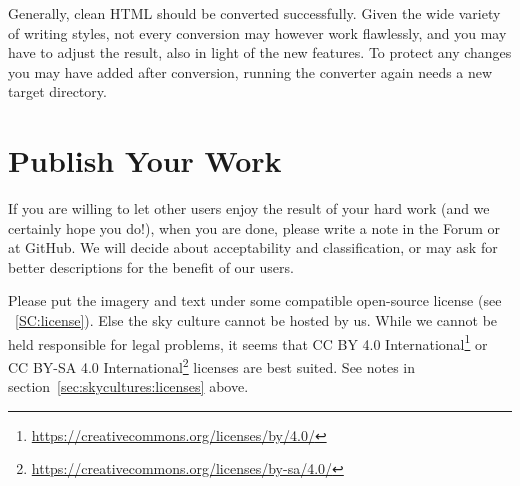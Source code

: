 Generally, clean HTML should be converted successfully. 
Given the wide variety of writing styles, not every conversion may however work flawlessly, 
and you may have to adjust the result, also in light of the new features. 
To protect any changes you may have added after conversion, running the converter again needs a new target directory. 


\section{Publish Your Work}
\label{sec:skyculture:publish}

If you are willing to let other users enjoy the result of your hard
work (and we certainly hope you do!), when you are done, please write
a note in the Forum or at GitHub. We will decide about acceptability
and classification, or may ask for better descriptions for the
benefit of our users.

Please put the imagery and text
under some compatible open-source license (see ~\ref{SC:license}).
Else the sky culture cannot be hosted by us.
While we cannot be held responsible for legal problems, it seems that
CC BY 4.0 International\footnote{\url{https://creativecommons.org/licenses/by/4.0/}} or
CC BY-SA 4.0 International\footnote{\url{https://creativecommons.org/licenses/by-sa/4.0/}}
licenses are best suited. See notes in section~\ref{sec:skycultures:licenses} above. 



